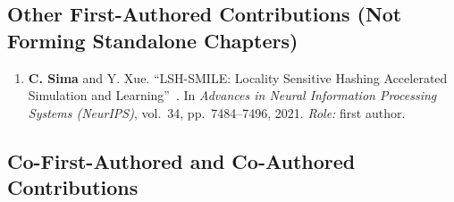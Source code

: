 \subsection*{Other First-Authored Contributions (Not Forming Standalone Chapters)}

\begin{enumerate}[label={\arabic*.}, leftmargin=2.4em, labelwidth=1.8em, labelsep=0.6em, align=left, itemsep=4pt, resume]
  \item \textbf{C. Sima} and Y. Xue.
        ``LSH-SMILE: Locality Sensitive Hashing Accelerated Simulation and Learning''~\cite{sima2021lshsmile}.
        In \emph{Advances in Neural Information Processing Systems (NeurIPS)}, vol.~34, pp.~7484--7496, 2021.
        \emph{Role:} first author.
\end{enumerate}

\subsection*{Co-First-Authored and Co-Authored Contributions}

